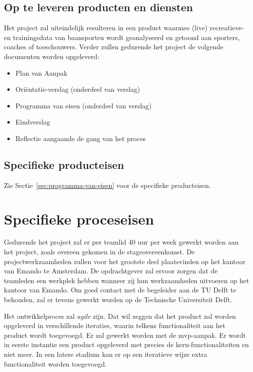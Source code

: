 

\subsection{Op te leveren producten en diensten}
Het project zal uiteindelijk resulteren in een product waarmee (live) recreatieve- en trainingsdata van baansporten wordt geanalyseerd en getoond aan sporters, coaches of toeschouwers. Verder zullen gedurende het project de volgende documenten worden opgeleverd: \begin{itemize}
\item Plan van Aanpak
\item Oriëntatie-verslag (onderdeel van verslag)
\item Programma van eisen (onderdeel van verslag)
\item Eindverslag
\item Reflectie aangaande de gang van het proces
\end{itemize}

\subsection{Specifieke producteisen}

\ifx\programmavaneisen\undefined

\else
Zie Sectie~\ref{sec:programma-van-eisen} voor de specifieke producteisen.
\fi

\section{Specifieke proceseisen}
Gedurende het project zal er per teamlid 40 uur per week gewerkt worden aan het project, zoals overeen gekomen in de stageovereenkomst.
De projectwerkzaamheden zullen voor het grootste deel plaatsvinden op het kantoor van Emando te Amsterdam. 
De opdrachtgever zal ervoor zorgen dat de teamleden een werkplek hebben wanneer zij hun werkzaamheden uitvoeren op het kantoor van Emando. Om goed contact met de begeleider aan de TU Delft te behouden, zal er tevens gewerkt worden op de Technische Universiteit Delft.

Het ontwikkelproces zal \textit{agile} zijn. Dat wil zeggen dat het product zal worden opgeleverd in verschillende iteraties, waarin telkens functionaliteit aan het product wordt toegevoegd.
Er zal gewerkt worden met de \acl{mvp}-aanpak. Er wordt in eerste instantie een product opgeleverd met precies de kern-functionaliteiten en niet meer. In een latere stadium kan er op een iteratieve wijze extra functionaliteit worden toegevoegd.

